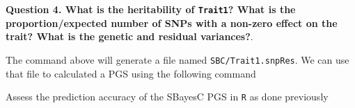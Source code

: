 \documentclass[
  letterpaper,
  DIV=11,
  numbers=noendperiod]{scrartcl}
\newenvironment{Shaded}{\begin{snugshade}}{\end{snugshade}}
\newcommand{\AttributeTok}[1]{\textcolor[rgb]{0.40,0.45,0.13}{#1}}
\newcommand{\DataTypeTok}[1]{\textcolor[rgb]{0.68,0.00,0.00}{#1}}
\newcommand{\NormalTok}[1]{\textcolor[rgb]{0.00,0.23,0.31}{#1}}
\newcommand{\OperatorTok}[1]{\textcolor[rgb]{0.37,0.37,0.37}{#1}}
\newcommand{\VariableTok}[1]{\textcolor[rgb]{0.07,0.07,0.07}{#1}}
\begin{document}
\textbf{Question 4. What is the heritability of \texttt{Trait1}? What is
the proportion/expected number of SNPs with a non-zero effect on the
trait? What is the genetic and residual variances?}.

The command above will generate a file named \texttt{SBC/Trait1.snpRes}.
We can use that file to calculated a PGS using the following command

\begin{Shaded}
\end{Shaded}

Assess the prediction accuracy of the SBayesC PGS in \texttt{R} as done
previously
\end{document}
